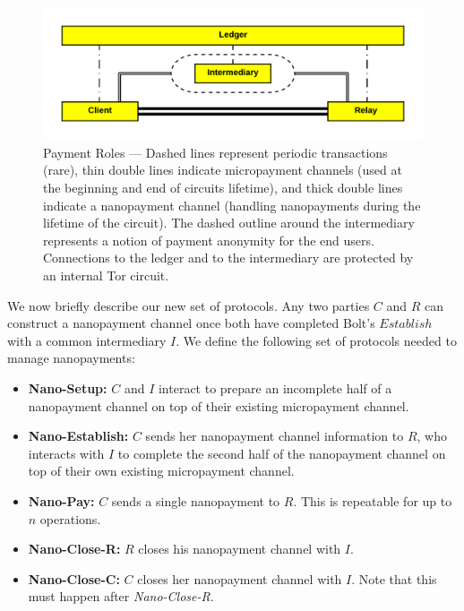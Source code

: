 \begin{figure}[h] \centering
  \includegraphics[trim={0.5cm, 0.5cm, 0.5cm, 0.5cm}, clip,
    scale=0.6]{images/party_diagram.png}
  \caption[Payment Roles]{Payment Roles --- Dashed lines represent periodic transactions (rare), thin double lines indicate micropayment channels (used at the beginning and end of circuits lifetime), and thick double lines indicate a nanopayment channel (handling nanopayments during the lifetime of the circuit).
    The dashed outline around the intermediary represents a notion of payment anonymity for the end users.
    Connections to the ledger and to the intermediary are protected by an internal Tor circuit.}
  \label{fig:parties}
\end{figure}

We now briefly describe our new set of protocols.
Any two parties $C$ and $R$ can construct a nanopayment channel once both have completed Bolt's $Establish$ with a common intermediary $I$.
We define the following set of protocols needed to manage nanopayments:

\begin{itemize}
\item \textbf{Nano-Setup:} $C$ and $I$ interact to prepare an incomplete half of a nanopayment channel on top of their existing micropayment channel.
\item \textbf{Nano-Establish:} $C$ sends her nanopayment channel information to $R$, who interacts with $I$ to complete the second half of the nanopayment channel on top of their own existing micropayment channel.
\item \textbf{Nano-Pay:} $C$ sends a single nanopayment to $R$.
This is repeatable for up to $n$ operations.
\item \textbf{Nano-Close-R:} $R$ closes his nanopayment channel with $I$.
\item \textbf{Nano-Close-C:} $C$ closes her nanopayment channel with $I$.
Note that this must happen after \emph{Nano-Close-R}.
\end{itemize}

